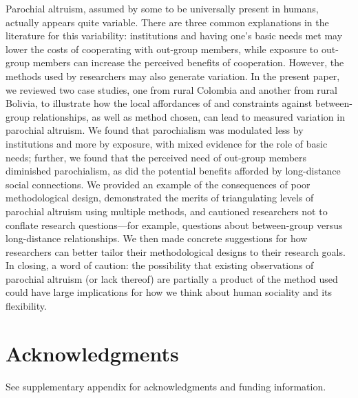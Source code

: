 \documentclass[bibauthoryear]{aa}
\begin{document}
Parochial altruism, assumed by some to be universally present in humans, actually appears quite variable. There are three common explanations in the literature for this variability: institutions and having one's basic needs met may lower the costs of cooperating with out-group members, while exposure to out-group members can increase the perceived benefits of cooperation. However, the methods used by researchers may also generate variation. In the present paper, we reviewed two case studies, one from rural Colombia and another from rural Bolivia, to illustrate how the local affordances of and constraints against between-group relationships, as well as method chosen, can lead to measured variation in parochial altruism. We found that parochialism was modulated less by institutions and more by exposure, with mixed evidence for the role of basic needs; further, we found that the perceived need of out-group members diminished parochialism, as did the potential benefits afforded by long-distance social connections. We provided an example of the consequences of poor methodological design, demonstrated the merits of triangulating levels of parochial altruism using multiple methods, and cautioned researchers not to conflate research questions---for example, questions about between-group versus long-distance relationships. We then made concrete suggestions for how researchers can better tailor their methodological designs to their research goals. In closing, a word of caution: the possibility that existing observations of parochial altruism (or lack thereof) are partially a product of the method used could have large implications for how we think about human sociality and its flexibility.

\section*{Acknowledgments}
See supplementary appendix for acknowledgments and funding information.





\end{document}

